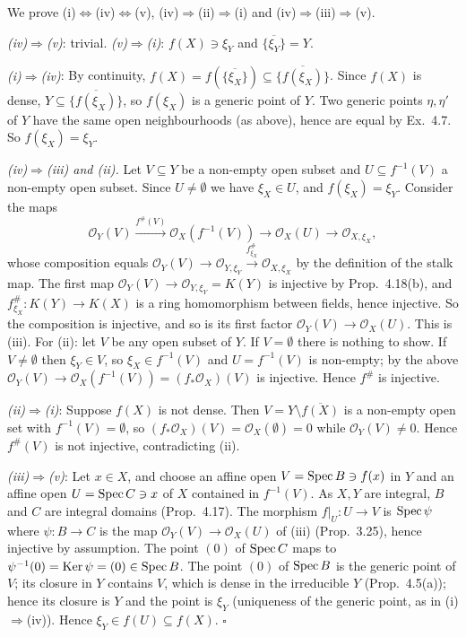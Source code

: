 \documentclass[11pt]{article}
\begin{document}
We prove (i)$\Leftrightarrow$(iv)$\Leftrightarrow$(v), (iv)$\Rightarrow$(ii)$\Rightarrow$(i) and (iv)$\Rightarrow$(iii)$\Rightarrow$(v).

\emph{(iv)$\Rightarrow$(v)}: trivial. \emph{(v)$\Rightarrow$(i)}: $f(X)\ni\xi_Y$ and $\overline{\{\xi_Y\}}=Y$.

\emph{(i)$\Rightarrow$(iv)}: By continuity, $f(X)=f(\overline{\{\xi_X\}})\subseteq\overline{\{f(\xi_X)\}}$. Since $f(X)$ is dense, $Y\subseteq\overline{\{f(\xi_X)\}}$, so $f(\xi_X)$ is a generic point of $Y$. Two generic points $\eta,\eta'$ of $Y$ have the same open neighbourhoods (as above), hence are equal by Ex.~4.7. So $f(\xi_X)=\xi_Y$.

\emph{(iv)$\Rightarrow$(iii) and (ii).} Let $V\subseteq Y$ be a non-empty open subset and $U\subseteq f^{-1}(V)$ a non-empty open subset. Since $U\ne\emptyset$ we have $\xi_X\in U$, and $f(\xi_X)=\xi_Y$. Consider the maps
\[ \mathcal O_Y(V)\xrightarrow{f^\#(V)}\mathcal O_X(f^{-1}(V))\to\mathcal O_X(U)\to\mathcal O_{X,\xi_X},\]
whose composition equals $\mathcal O_Y(V)\to\mathcal O_{Y,\xi_Y}\xrightarrow{f^\#_{\xi_X}}\mathcal O_{X,\xi_X}$ by the definition of the stalk map. The first map $\mathcal O_Y(V)\to\mathcal O_{Y,\xi_Y}=K(Y)$ is injective by Prop.~4.18(b), and $f^\#_{\xi_X}:K(Y)\to K(X)$ is a ring homomorphism between fields, hence injective. So the composition is injective, and so is its first factor $\mathcal O_Y(V)\to\mathcal O_X(U)$. This is (iii). For (ii): let $V$ be any open subset of $Y$. If $V=\emptyset$ there is nothing to show. If $V\ne\emptyset$ then $\xi_Y\in V$, so $\xi_X\in f^{-1}(V)$ and $U=f^{-1}(V)$ is non-empty; by the above $\mathcal O_Y(V)\to\mathcal O_X(f^{-1}(V))=(f_*\mathcal O_X)(V)$ is injective. Hence $f^\#$ is injective.

\emph{(ii)$\Rightarrow$(i)}: Suppose $f(X)$ is not dense. Then $V=Y\setminus\overline{f(X)}$ is a non-empty open set with $f^{-1}(V)=\emptyset$, so $(f_*\mathcal O_X)(V)=\mathcal O_X(\emptyset)=0$ while $\mathcal O_Y(V)\ne0$. Hence $f^\#(V)$ is not injective, contradicting (ii).

\emph{(iii)$\Rightarrow$(v)}: Let $x\in X$, and choose an affine open $V=\operatorname{Spec} B\ni f(x)$ in $Y$ and an affine open $U=\operatorname{Spec} C\ni x$ of $X$ contained in $f^{-1}(V)$. As $X,Y$ are integral, $B$ and $C$ are integral domains (Prop.~4.17). The morphism $f|_U:U\to V$ is $\operatorname{Spec}\psi$ where $\psi:B\to C$ is the map $\mathcal O_Y(V)\to\mathcal O_X(U)$ of (iii) (Prop.~3.25), hence injective by assumption. The point $(0)$ of $\operatorname{Spec} C$ maps to $\psi^{-1}(0)=\operatorname{Ker}\psi=(0)\in\operatorname{Spec} B$. The point $(0)$ of $\operatorname{Spec} B$ is the generic point of $V$; its closure in $Y$ contains $V$, which is dense in the irreducible $Y$ (Prop.~4.5(a)); hence its closure is $Y$ and the point is $\xi_Y$ (uniqueness of the generic point, as in (i)$\Rightarrow$(iv)). Hence $\xi_Y\in f(U)\subseteq f(X)$. \hfill$\square$
\end{document}
